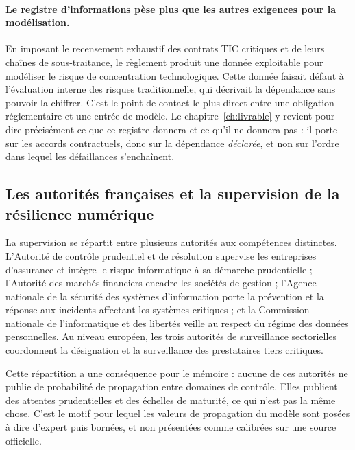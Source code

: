 \paragraph{Le registre d'informations pèse plus que les autres exigences pour la modélisation.}
En imposant le recensement exhaustif des contrats TIC critiques et de leurs chaînes de
sous-traitance, le règlement produit une donnée exploitable pour modéliser le risque de
concentration technologique. Cette donnée faisait défaut à l'évaluation interne des risques
traditionnelle, qui décrivait la dépendance sans pouvoir la chiffrer. C'est le point de contact
le plus direct entre une obligation réglementaire et une entrée de modèle. Le
chapitre~\ref{ch:livrable} y revient pour dire précisément ce que ce registre donnera et ce
qu'il ne donnera pas : il porte sur les accords contractuels, donc sur la dépendance
\emph{déclarée}, et non sur l'ordre dans lequel les défaillances s'enchaînent.

\subsection{Les autorités françaises et la supervision de la résilience numérique}
\label{subsec:supervision-france}

La supervision se répartit entre plusieurs autorités aux compétences distinctes. L'Autorité de
contrôle prudentiel et de résolution supervise les entreprises d'assurance et intègre le risque
informatique à sa démarche prudentielle ; l'Autorité des marchés financiers encadre les sociétés
de gestion ; l'Agence nationale de la sécurité des systèmes d'information porte la prévention et
la réponse aux incidents affectant les systèmes critiques ; et la Commission nationale de
l'informatique et des libertés veille au respect du régime des données personnelles. Au niveau
européen, les trois autorités de surveillance sectorielles coordonnent la désignation et la
surveillance des prestataires tiers critiques.

Cette répartition a une conséquence pour le mémoire : aucune de ces autorités ne publie de
probabilité de propagation entre domaines de contrôle. Elles publient des attentes prudentielles
et des échelles de maturité, ce qui n'est pas la même chose. C'est le motif pour lequel les
valeurs de propagation du modèle sont posées à dire d'expert puis bornées, et non présentées
comme calibrées sur une source officielle.

